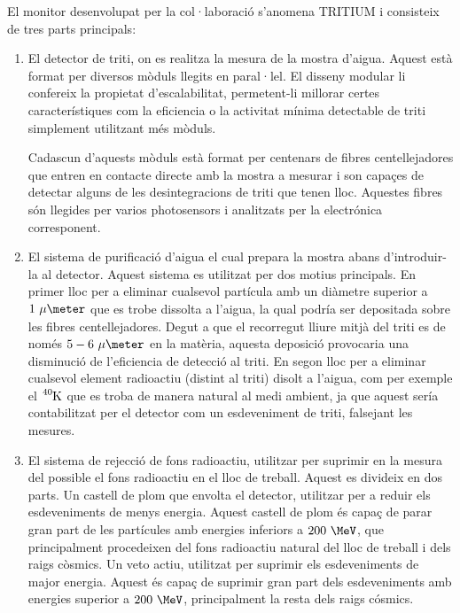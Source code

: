 El monitor desenvolupat per la col·laboració s'anomena TRITIUM i consisteix de tres parts principals:

\begin{enumerate}

\item{} El detector de triti, on es realitza la mesura de la mostra d'aigua. Aquest està format per diversos mòduls llegits en paral·lel. El disseny modular li confereix la propietat d'escalabilitat, permetent-li millorar certes característiques com la eficiencia o la activitat mínima detectable de triti simplement utilitzant més mòduls.

Cadascun d'aquests mòduls està format per centenars de fibres centellejadores que entren en contacte directe amb la mostra a mesurar i son capaçes de detectar alguns de les desintegracions de triti que tenen lloc. Aquestes fibres són llegides per varios photosensors i analitzats per la electrónica corresponent.

\item{} El sistema de purificació d'aigua el cual prepara la mostra abans d'introduir-la al detector. Aquest sistema es utilitzat per dos motius principals. En primer lloc per a eliminar cualsevol partícula amb un diàmetre superior a $1~\mu\meter$ que es trobe dissolta a l'aigua, la qual podría ser depositada sobre les fibres centellejadores. Degut a que el recorregut lliure mitjà del triti es de només $5-6~\mu\meter$ en la matèria, aquesta deposició provocaria una disminució de l'eficiencia de detecció al triti. En segon lloc per a eliminar cualsevol element radioactiu (distint al triti) disolt a l'aigua, com per exemple el $\ce{^{40}K}$ que es troba de manera natural al medi ambient, ja que aquest sería contabilitzat per el detector com un esdeveniment de triti, falsejant les mesures.

\item{} El sistema de rejecció de fons radioactiu, utilitzar per suprimir en la mesura del possible el fons radioactiu en el lloc de treball. Aquest es divideix en dos parts. Un castell de plom que envolta el detector, utilitzar per a reduir els esdeveniments de menys energia. Aquest castell de plom és capaç de parar gran part de les partícules amb energies inferiors a $200~\MeV$, que principalment procedeixen del fons radioactiu natural del lloc de treball i dels raigs còsmics. Un veto actiu, utilitzat per suprimir els esdeveniments de major energia. Aquest és capaç de suprimir gran part dels esdeveniments amb energies superior a $200~\MeV$, principalment la resta dels raigs cósmics.

\end{enumerate}

